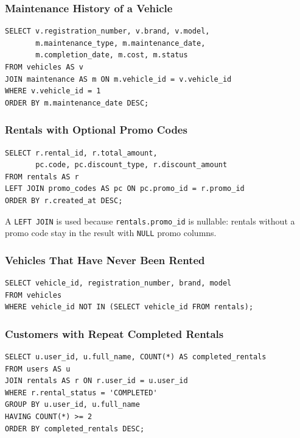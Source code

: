 \documentclass[10pt,a4paper]{report}
\newcommand{\col}[1]{\texttt{#1}}
\begin{document}
\subsubsection{Maintenance History of a Vehicle}
\begin{lstlisting}[caption={Joining vehicles and maintenance},label={lst:q6}]
SELECT v.registration_number, v.brand, v.model,
       m.maintenance_type, m.maintenance_date,
       m.completion_date, m.cost, m.status
FROM vehicles AS v
JOIN maintenance AS m ON m.vehicle_id = v.vehicle_id
WHERE v.vehicle_id = 1
ORDER BY m.maintenance_date DESC;
\end{lstlisting}

\subsubsection{Rentals with Optional Promo Codes}
\begin{lstlisting}[caption={LEFT JOIN for an optional relationship},label={lst:q7}]
SELECT r.rental_id, r.total_amount,
       pc.code, pc.discount_type, r.discount_amount
FROM rentals AS r
LEFT JOIN promo_codes AS pc ON pc.promo_id = r.promo_id
ORDER BY r.created_at DESC;
\end{lstlisting}
A \col{LEFT JOIN} is used because \col{rentals.promo_id} is nullable: rentals without a promo code stay in the result with \col{NULL} promo columns.

\subsubsection{Vehicles That Have Never Been Rented}
\begin{lstlisting}[caption={Subquery with NOT IN},label={lst:q8}]
SELECT vehicle_id, registration_number, brand, model
FROM vehicles
WHERE vehicle_id NOT IN (SELECT vehicle_id FROM rentals);
\end{lstlisting}

\subsubsection{Customers with Repeat Completed Rentals}
\begin{lstlisting}[caption={GROUP BY with HAVING},label={lst:q9}]
SELECT u.user_id, u.full_name, COUNT(*) AS completed_rentals
FROM users AS u
JOIN rentals AS r ON r.user_id = u.user_id
WHERE r.rental_status = 'COMPLETED'
GROUP BY u.user_id, u.full_name
HAVING COUNT(*) >= 2
ORDER BY completed_rentals DESC;
\end{lstlisting}
\end{document}
